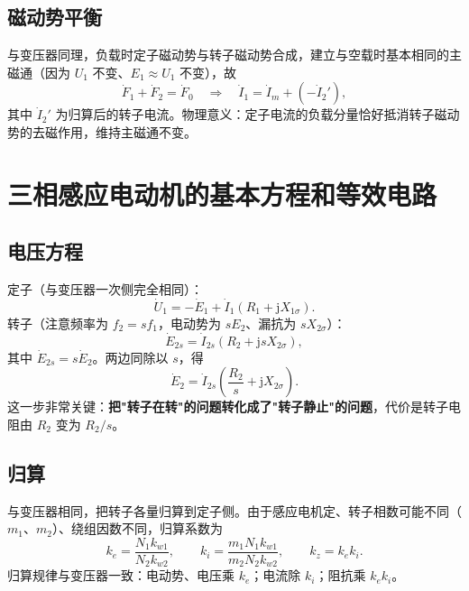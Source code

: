 \subsection{磁动势平衡}
与变压器同理，负载时定子磁动势与转子磁动势合成，建立与空载时基本相同的主磁通（因为 $U_1$ 不变、$E_1\approx U_1$ 不变），故
\begin{equation}
\dot F_1+\dot F_2=\dot F_0
\quad\Longrightarrow\quad
\dot I_1=\dot I_m+\left(-\dot I_2'\right),
\end{equation}
其中 $\dot I_2'$ 为归算后的转子电流。物理意义：定子电流的负载分量恰好抵消转子磁动势的去磁作用，维持主磁通不变。


\section{三相感应电动机的基本方程和等效电路}

\subsection{电压方程}
定子（与变压器一次侧完全相同）：
\begin{equation}
\dot U_1=-\dot E_1+\dot I_1\left(R_1+\mathrm{j}X_{1\sigma}\right).
\end{equation}
转子（注意频率为 $f_2=sf_1$，电动势为 $sE_2$、漏抗为 $sX_{2\sigma}$）：
\begin{equation}
\dot E_{2s}=\dot I_{2s}\left(R_2+\mathrm{j}sX_{2\sigma}\right),
\end{equation}
其中 $\dot E_{2s}=s\dot E_2$。两边同除以 $s$，得
\begin{equation}
\dot E_2=\dot I_{2s}\left(\frac{R_2}{s}+\mathrm{j}X_{2\sigma}\right).
\end{equation}
这一步非常关键：\textbf{把"转子在转"的问题转化成了"转子静止"的问题}，代价是转子电阻由 $R_2$ 变为 $R_2/s$。

\subsection{归算}
与变压器相同，把转子各量归算到定子侧。由于感应电机定、转子相数可能不同（$m_1$、$m_2$）、绕组因数不同，归算系数为
\begin{equation}
k_e=\frac{N_1k_{w1}}{N_2k_{w2}},\qquad
k_i=\frac{m_1N_1k_{w1}}{m_2N_2k_{w2}},\qquad
k_z=k_ek_i .
\end{equation}
归算规律与变压器一致：电动势、电压乘 $k_e$；电流除 $k_i$；阻抗乘 $k_ek_i$。

